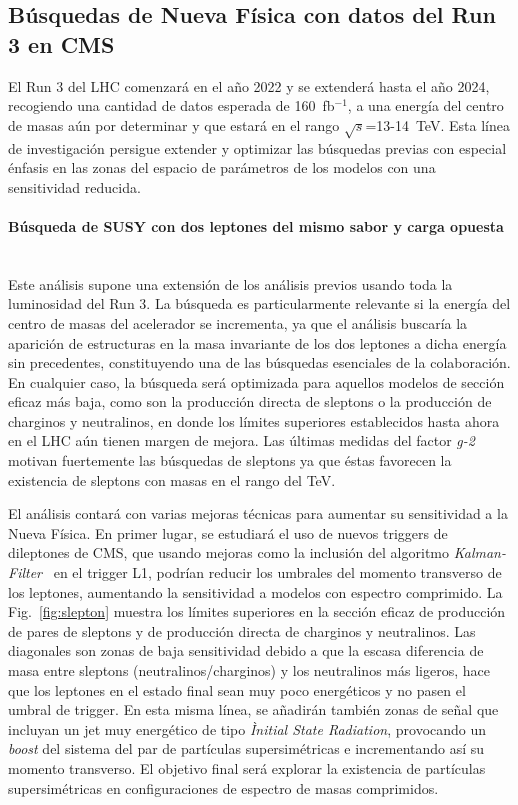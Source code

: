 \subsection{Búsquedas de Nueva Física con datos del Run 3 en CMS}

El Run 3 del LHC comenzará en el año 2022 y se extenderá hasta el año 2024, recogiendo una cantidad de datos esperada de 160~fb$^{-1}$, a una energía del centro de masas aún por determinar y que estará en el rango $\sqrt{s}$=13-14~TeV. Esta línea de investigación persigue extender y optimizar las búsquedas previas con especial énfasis en las zonas del espacio de parámetros de los modelos con una sensitividad reducida.  

\paragraph{Búsqueda de SUSY con dos leptones del mismo sabor y carga opuesta\\\\}

Este análisis supone una extensión de los análisis previos usando toda la luminosidad del Run 3. La búsqueda es particularmente relevante si la energía del centro de masas del acelerador se incrementa, ya que el análisis buscaría la aparición de estructuras en la masa invariante de los dos leptones a dicha energía sin precedentes, constituyendo una de las búsquedas esenciales de la colaboración. En cualquier caso, la búsqueda será optimizada para aquellos modelos de sección eficaz más baja, como son la producción directa de sleptons o la producción de charginos y neutralinos, en donde los límites superiores establecidos hasta ahora en el LHC aún tienen margen de mejora. Las últimas medidas del factor \emph{g-2} motivan fuertemente las búsquedas de sleptons ya que éstas favorecen la existencia de sleptons con masas en el rango del TeV. 

El análisis contará con varias mejoras técnicas para aumentar su sensitividad a la Nueva Física. En primer lugar, se estudiará el uso de nuevos triggers de dileptones de CMS, que usando mejoras como la inclusión del algoritmo \emph{Kalman-Filter}~\cite{bib:kalman} en el trigger L1, podrían reducir los umbrales del momento transverso de los leptones, aumentando la sensitividad a modelos con espectro comprimido. La Fig.~\ref{fig:slepton} muestra los límites superiores en la sección eficaz de producción de pares de sleptons y de producción directa de charginos y neutralinos. Las diagonales son zonas de baja sensitividad debido a que la escasa diferencia de masa entre sleptons (neutralinos/charginos) y los neutralinos más ligeros, hace que los leptones en el estado final sean muy poco energéticos y no pasen el umbral de trigger. En esta misma línea, se añadirán también zonas de señal que incluyan un jet muy energético de tipo \emph{Ìnitial State Radiation}, provocando un \emph{boost} del sistema del par de partículas supersimétricas e incrementando así su momento transverso. El objetivo final será explorar la existencia de partículas supersimétricas en configuraciones de espectro de masas comprimidos.

